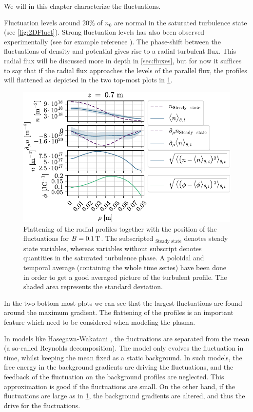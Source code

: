 We will in this chapter characterize the fluctuations.

Fluctuation levels around $20\%$ of $n_0$ are normal in the saturated turbulence state (see \cref{fig:2DFluct}).
Strong fluctuation levels has also been observed experimentally (see for example reference \cite{Burin2005}).
The phase-shift between the fluctuations of density and potential gives rise to a radial turbulent flux.
This radial flux will be discussed more in depth in \cref{sec:fluxes}, but for now it suffices to say that if the radial flux approaches the levels of the parallel flux, the profiles will flattened as depicted in the two top-most plots in \cref{fig:posOfFluct01}.
%
\begin{figure}[h!]
    \begin{center}
        \includegraphics{fig/results/posOfFluct/posOfFluctB01}
    \end{center}
    \caption{Flattening of the radial profiles together with the position of the fluctuations for $B=0.1\, \text{T}$.
        The subscripted $_\text{Steady state}$ denotes steady state variables, whereas variables without subscript denotes quantities in the saturated turbulence phase.
        A poloidal and temporal average (containing the whole time series) have been done in order to get a good averaged picture of the turbulent profile.
        The shaded area represents the standard deviation.
    }
    \label{fig:posOfFluct01}
\end{figure}
%
In the two bottom-most plots we can see that the largest fluctuations are found around the maximum gradient.
The flattening of the profiles is an important feature which need to be considered when modeling the plasma.

In models like Hasegawa-Wakatani \cite{Hasegawa1987,Holland2007}, the fluctuations are separated from the mean (a so-called Reynolds decomposition).
The model only evolves the fluctuation in time, whilst keeping the mean fixed as a static background.
In such models, the free energy in the background gradients are driving the fluctuations, and the feedback of the fluctuation on the background profiles are neglected.
This approximation is good if the fluctuations are small.
On the other hand, if the fluctuations are large as in \cref{fig:posOfFluct01}, the background gradients are altered, and thus the drive for the fluctuations.

